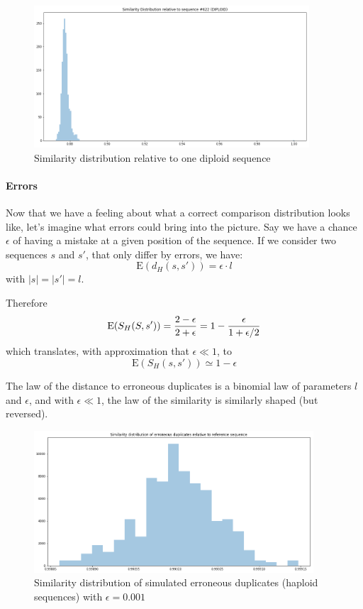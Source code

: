 \documentclass[usletter,11pt,final]{article}
\begin{document}
\begin{figure}
\begin{center}
\includegraphics[height=200px]{indivhistdipl.png}
\caption{Similarity distribution relative to one diploid sequence}
\label{diplhist}
\end{center}
\end{figure}

\paragraph{Errors}

Now that we have a feeling about what a correct comparison distribution looks like, let's imagine what errors could bring into the picture. Say we have a chance $\epsilon$ of having a mistake at a given position of the sequence. If we consider two sequences $s$ and $s'$, that only differ by errors, we have:
$$ \textrm{E}(d_H(s,s')) = \epsilon \cdot l$$
with $|s|=|s'|=l$.

Therefore $$ \textrm{E}(S_H(S,s')) = {2-\epsilon \over 2+\epsilon} = 1 - \frac{\epsilon}{1+\epsilon/2}$$ which translates, with approximation that $\epsilon \ll 1$, to $$ \textrm{E}(S_H(s,s')) \simeq 1 - \epsilon$$

The law of the distance to erroneous duplicates is a binomial law of parameters $l$ and $\epsilon$, and with $\epsilon \ll 1$, the law of the similarity is similarly shaped (but reversed).

\begin{figure}
\begin{center}
\includegraphics[height=200px]{errors.png}
\caption{Similarity distribution of simulated erroneous duplicates (haploid sequences) with $\epsilon = 0.001$}
\label{errors}
\end{center}
\end{figure}
\end{document}
